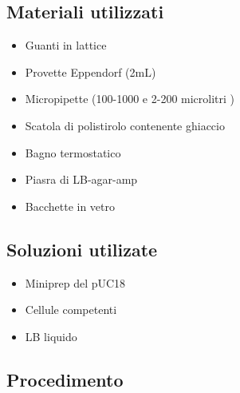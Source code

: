 \subsection{Materiali utilizzati}

\begin{itemize}
	\item Guanti in lattice
	\item Provette Eppendorf (2mL)
	\item Micropipette (100-1000  e 2-200 microlitri  )
	\item Scatola di polistirolo contenente ghiaccio
	\item Bagno termostatico
	\item Piasra di LB-agar-amp
	\item Bacchette in vetro
\end{itemize}

\subsection{Soluzioni utilizate}

\begin{itemize}
	\item Miniprep del pUC18
	\item Cellule competenti
	\item LB liquido
\end{itemize}

\subsection{Procedimento}

